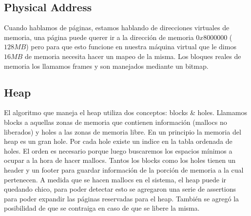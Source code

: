 \documentclass[english]{article}
\begin{document}
\subsection{Physical Address}

Cuando hablamos de páginas, estamos hablando de direcciones virtuales
de memoria, una página puede querer ir a la dirección de memoria $0x8000000$
($128MB$) pero para que esto funcione en nuestra máquina virtual
que le dimos $16MB$ de memoria necesita hacer un mapeo de la misma.
Los bloques reales de memoria los llamamos frames y son manejados
mediante un bitmap.


\subsection{Heap}

El algoritmo que maneja el heap utiliza dos conceptos: blocks \& holes.
Llamamos blocks a aquellas zonas de memoria que contienen información
(mallocs no liberados) y holes a las zonas de memoria libre. En un
principio la memoria del heap es un gran hole. Por cada hole existe
un indice en la tabla ordenada de holes. El orden es necesario porque
luego buscaremos los espacios mínimos a ocupar a la hora de hacer
mallocs. Tantos los blocks como los holes tienen un header y un footer
para guardar información de la porción de memoria a la cual pertenecen.
A medida que se hacen mallocs en el sistema, el heap puede ir quedando
chico, para poder detectar esto se agregaron una serie de assertions
para poder expandir las páginas reservadas para el heap. También se
agregó la posibilidad de que se contraiga en caso de que se libere
la misma.
\end{document}

